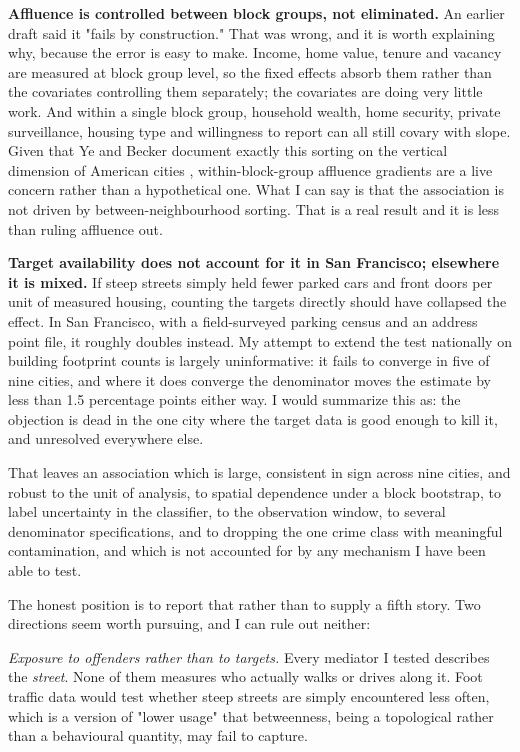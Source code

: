 \documentclass[10pt,letterpaper]{article}
\begin{document}
\textbf{Affluence is controlled between block groups, not eliminated.} An earlier
draft said it "fails by construction." That was wrong, and it is worth explaining
why, because the error is easy to make. Income, home value, tenure and vacancy are
measured at block group level, so the fixed effects absorb them rather than the
covariates controlling them separately; the covariates are doing very little work. And
within a single block group, household wealth, home security, private surveillance,
housing type and willingness to report can all still covary with slope. Given that Ye
and Becker document exactly this sorting on the vertical dimension of American cities
\cite{yebecker2018}, within-block-group affluence gradients are a live concern rather
than a hypothetical one. What I can say is that the association is not driven by
between-neighbourhood sorting. That is a real result and it is less than ruling
affluence out.

\textbf{Target availability does not account for it in San Francisco; elsewhere it is
mixed.} If steep streets simply held fewer parked cars and front doors per unit of
measured housing, counting the targets directly should have collapsed the effect. In
San Francisco, with a field-surveyed parking census and an address point file, it
roughly doubles instead. My attempt to extend the test nationally on building
footprint counts is largely uninformative: it fails to converge in five of nine
cities, and where it does converge the denominator moves the estimate by less than
1.5 percentage points either way. I would summarize this as: the objection is dead in
the one city where the target data is good enough to kill it, and unresolved
everywhere else.

That leaves an association which is large, consistent in sign across nine cities, and
robust to the unit of analysis, to spatial dependence under a block bootstrap, to
label uncertainty in the classifier, to the observation window, to several denominator
specifications, and to dropping the one crime class with meaningful contamination, and
which is not accounted for by any mechanism I have been able to test.

The honest position is to report that rather than to supply a fifth story. Two
directions seem worth pursuing, and I can rule out neither:

\emph{Exposure to offenders rather than to targets.} Every mediator I tested describes
the \emph{street}. None of them measures who actually walks or drives along it.
Foot traffic data would test whether steep streets are simply encountered less often,
which is a version of "lower usage" that betweenness, being a topological rather than
a behavioural quantity, may fail to capture.
\end{document}
